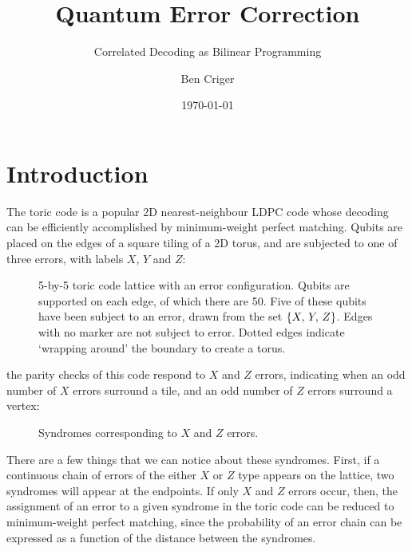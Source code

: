 \documentclass[a4paper, english]{scrartcl}
\title{Quantum Error Correction}
\subtitle{Correlated Decoding as Bilinear Programming}
\author{Ben Criger}
\date{\today}
\begin{document}
\maketitle
\section{Introduction}
The toric code is a popular 2D nearest-neighbour LDPC code whose decoding can be efficiently accomplished by minimum-weight perfect matching. 
Qubits are placed on the edges of a square tiling of a 2D torus, and are subjected to one of three errors, with labels $X$, $Y$ and $Z$:
\begin{figure}[!h]
\centering
{}
\caption{5-by-5 toric code lattice with an error configuration.
Qubits are supported on each edge, of which there are 50.
Five of these qubits have been subject to an error, drawn from the set $\left \lbrace X,\,Y,\,Z \right \rbrace$. 
Edges with no marker are not subject to error. 
Dotted edges indicate `wrapping around' the boundary to create a torus.}
\end{figure}

the parity checks of this code respond to $X$ and $Z$ errors, indicating when an odd number of $X$ errors surround a tile, and an odd number of $Z$ errors surround a vertex:
\begin{figure}[!h]
\centering
{}
\caption{Syndromes corresponding to $X$ and $Z$ errors.}
\end{figure}
\FloatBarrier
There are a few things that we can notice about these syndromes. 
First, if a continuous chain of errors of the either $X$ or $Z$ type appears on the lattice, two syndromes will appear at the endpoints. 
If only $X$ and $Z$ errors occur, then, the assignment of an error to a given syndrome in the toric code can be reduced to minimum-weight perfect matching, since the probability of an error chain can be expressed as a function of the distance between the syndromes.
\end{document}
